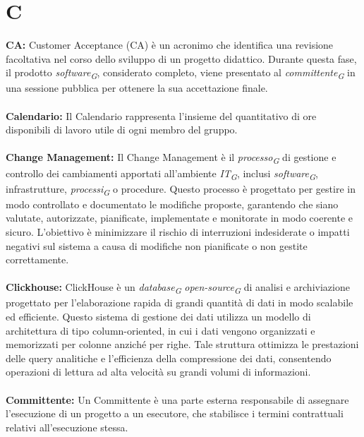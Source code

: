 \documentclass{article}
\begin{document}
\section*{C}
{}
\textbf{CA:} Customer Acceptance (CA) è un acronimo che identifica una revisione facoltativa nel corso dello sviluppo di un progetto didattico. Durante questa fase, il prodotto \textit{software}\textsubscript{\textit{G}}, considerato completo, viene presentato al \textit{committente}\textsubscript{\textit{G}} in una sessione pubblica per ottenere la sua accettazione finale.
\\
\\
\textbf{Calendario:} Il Calendario rappresenta l’insieme del quantitativo di ore disponibili di lavoro utile di ogni membro del gruppo.
\\
\\
\textbf{Change Management:} Il Change Management è il \textit{processo}\textsubscript{\textit{G}} di gestione e controllo dei cambiamenti apportati all'ambiente \textit{IT}\textsubscript{\textit{G}}, inclusi \textit{software}\textsubscript{\textit{G}}, infrastrutture, \textit{processi}\textsubscript{\textit{G}} o procedure. Questo processo è progettato per gestire in modo controllato e documentato le modifiche proposte, garantendo che siano valutate, autorizzate, pianificate, implementate e monitorate in modo coerente e sicuro. L'obiettivo è minimizzare il rischio di interruzioni indesiderate o impatti negativi sul sistema a causa di modifiche non pianificate o non gestite correttamente.
\\
\\
\textbf{Clickhouse:} ClickHouse è un \textit{database}\textsubscript{\textit{G}} \textit{open-source}\textsubscript{\textit{G}} di analisi e archiviazione progettato per l'elaborazione rapida di grandi quantità di dati in modo scalabile ed efficiente. Questo sistema di gestione dei dati utilizza un modello di architettura di tipo column-oriented, in cui i dati vengono organizzati e memorizzati per colonne anziché per righe. Tale struttura ottimizza le prestazioni delle query analitiche e l'efficienza della compressione dei dati, consentendo operazioni di lettura ad alta velocità su grandi volumi di informazioni. 
\\
\\
\textbf{Committente:} Un Committente è una parte esterna responsabile di assegnare l'esecuzione di un progetto a un esecutore, che stabilisce i termini contrattuali relativi all'esecuzione stessa.
\end{document}
